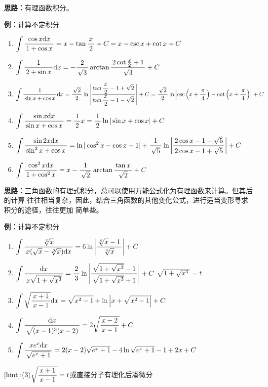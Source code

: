 \begin{shaded}
{\bf 思路：}有理函数积分。
\end{shaded}

{\bf 例：}计算不定积分
\begin{enumerate}[(1)]
  \setlength{\itemindent}{1cm}
  \item $\dint\df{\cos x\d x}{1+\cos x}=x-\tan\df x2+C=x-\csc x+\cot x+C$
  \item $\dint\df1{2+\sin x}\d x=-\df2{\sqrt3}\arctan\df{2\cot\frac 
  x2+1}{\sqrt 3}+C$
  \item $\dint\df1{\sin x+\cos x}\d x=\df{\sqrt 2}{2}\ln\left|
  \df{\tan\df x2-1+\sqrt 2}{\tan\df x2-1-\sqrt 2}\right|+C
  =\df{\sqrt2}2\ln\left|\csc\left(x+\df{\pi}4\right)
  -\cot\left(x+\df{\pi}4\right)\right|+C$
  \item $\dint\df{\sin x\d x}{\sin x+\cos x}=\df12x=\df12
  \ln|\sin x+\cos x|+C$
  \item $\dint\df{\sin2x\d x}{\sin^2x+\cos x}=
  \ln|\cos^2x-\cos x-1|+\df1{\sqrt5}\ln\left|
  \df{2\cos x-1-\sqrt5}{2\cos x-1+\sqrt 5}\right|+C$
  \item $\dint\df{\cos^2x\d x}{1+\cos^2x}=x-\df1{\sqrt2}\arctan
  \df{\tan x}{\sqrt 2}+C$
\end{enumerate}

\begin{shaded}
{\bf 思路：}三角函数的有理式积分，总可以使用万能公式化为有理函数来计算。但其后的计算
往往相当复杂，因此，结合三角函数的其他变化公式，进行适当变形寻求积分的途径，往往更加
简单些。
\end{shaded}

{\bf 例：}计算不定积分
\begin{enumerate}[(1)]
  \setlength{\itemindent}{1cm}
  \item $\dint\df{\sqrt[3]x}{x(\sqrt x-\sqrt[3]x)\d x}=6\ln\left|
  \df{\sqrt[6]x-1}{\sqrt[6]x}\right|+C$
  \item $\dint\df{\d x}{x\sqrt{1+\sqrt{x^3}}}=\df23\ln\left|
  \df{\sqrt{1+\sqrt{x^3}}-1}{\sqrt{1+\sqrt{x^3}}+1}\right|+C$
  \hfill$\sqrt{1+\sqrt{x^3}}=t$
  \item $\dint\sqrt{\df{x+1}{x-1}}\d x=\sqrt{x^2-1}+\ln\left|
  x+\sqrt{x^2-1}\right|+C$
  \item $\dint\df{\d x}{\sqrt(x-1)^3(x-2)}=2\sqrt{\df{x-2}{x-1}}+C$
  \item $\dint\df{xe^x\d x}{\sqrt{e^x+1}}=2(x-2)\sqrt{e^x+1}
  -4\ln{\sqrt{e^x+1}-1}+2x+C$
\end{enumerate}

[hint]:(3)$\sqrt{\df{x+1}{x-1}}=t$或直接分子有理化后凑微分

